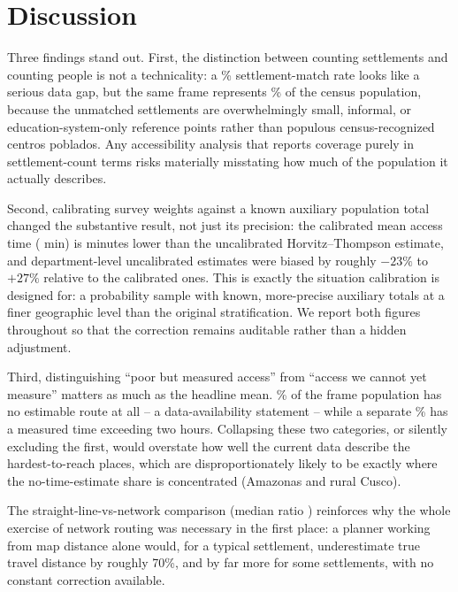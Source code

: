 \section{Discussion}
\label{sec:discussion}

Three findings stand out. First, the distinction between counting settlements and counting people is not a technicality: a \PopulationMatchedPct\% settlement-match rate looks like a serious data gap, but the same frame represents \FrameCoveragePct\% of the census population, because the unmatched settlements are overwhelmingly small, informal, or education-system-only reference points rather than populous census-recognized centros poblados. Any accessibility analysis that reports coverage purely in settlement-count terms risks materially misstating how much of the population it actually describes.

Second, calibrating survey weights against a known auxiliary population total changed the substantive result, not just its precision: the calibrated mean access time (\MeanAccessTotal{} min) is \MeanAccessDiffHtCal{} minutes lower than the uncalibrated Horvitz--Thompson estimate, and department-level uncalibrated estimates were biased by roughly $-23\%$ to $+27\%$ relative to the calibrated ones. This is exactly the situation calibration is designed for: a probability sample with known, more-precise auxiliary totals at a finer geographic level than the original stratification. We report both figures throughout so that the correction remains auditable rather than a hidden adjustment.

Third, distinguishing ``poor but measured access'' from ``access we cannot yet measure'' matters as much as the headline mean. \CovNoTimeTotal\% of the frame population has no estimable route at all -- a data-availability statement -- while a separate \CovGtOneTwentyTotal\% has a measured time exceeding two hours. Collapsing these two categories, or silently excluding the first, would overstate how well the current data describe the hardest-to-reach places, which are disproportionately likely to be exactly where the no-time-estimate share is concentrated (Amazonas and rural Cusco).

The straight-line-vs-network comparison (median ratio \SvnMedian) reinforces why the whole exercise of network routing was necessary in the first place: a planner working from map distance alone would, for a typical settlement, underestimate true travel distance by roughly 70\%, and by far more for some settlements, with no constant correction available.
